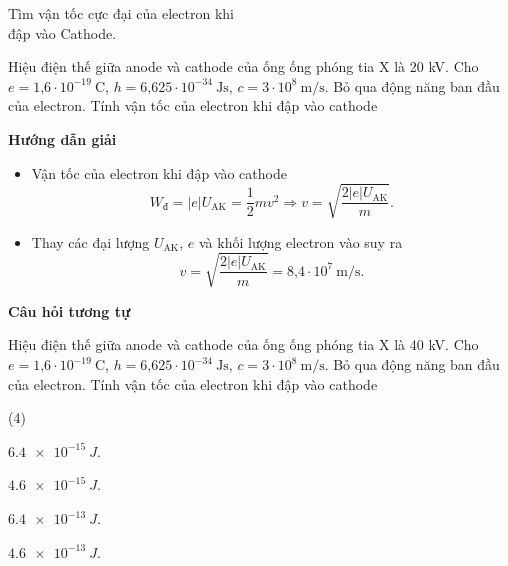 \begin{dang}{Tìm vận tốc cực đại của electron khi\\ đập vào Cathode.}
	
	
	{
		Hiệu điện thế giữa anode và cathode của ống ống phóng tia X là  20 kV. Cho $e=\text{1,6}\cdot 10^{-19}\ \text{C}$, $h=\text{6,625} \cdot 10^{-34}\ \text{Js}$, $c=3\cdot 10^8\ \text{m/s}$. Bỏ qua động năng ban đầu của electron. Tính vận tốc của electron khi đập vào cathode
	}
	{\begin{center}
			\textbf{Hướng dẫn giải}
		\end{center}
		\begin{itemize}
			\item Vận tốc của electron khi đập vào cathode
			\begin{equation*} W_{\text{đ}}=|e|U_{\text{AK}}=\dfrac{1}{2}mv^2 \Rightarrow v =\sqrt {\dfrac{2|e|U_{\text{AK}}}{m}}.
			\end{equation*}
			\item Thay các đại lượng $U_{\text{AK}}$, $e$ và khối lượng electron vào suy ra
			\begin{equation*}
				v =\sqrt {\dfrac{2|e|U_{\text{AK}}}{m}} = \text{8,4} \cdot 10^7 \ \text{m/s}.
			\end{equation*}
		\end{itemize}
		
		\begin{center}
			\textbf{Câu hỏi tương tự}
		\end{center}
		
		Hiệu điện thế giữa anode và cathode của ống ống phóng tia X là  40 kV. Cho $e=\text{1,6}\cdot 10^{-19}\ \text{C}$, $h=\text{6,625} \cdot 10^{-34}\ \text{Js}$, $c=3\cdot 10^8\ \text{m/s}$. Bỏ qua động năng ban đầu của electron. Tính vận tốc của electron khi đập vào cathode
		\begin{mcq}(4)
			\item $ \SI{6,4 e-15}{J} $.
			\item $ \SI{4,6 e-15}{J} $.
			\item $ \SI{6,4 e-13}{J} $.
			\item $ \SI{4,6 e-13}{J} $.
		\end{mcq}
		
}
\end{dang}
